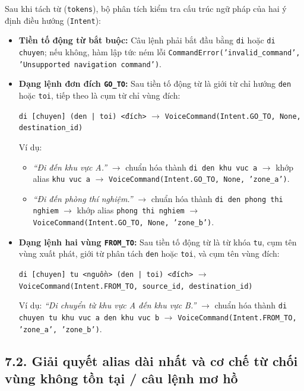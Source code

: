 Sau khi tách từ (\texttt{tokens}), bộ phân tích kiểm tra cấu trúc ngữ pháp của hai ý định điều hướng (\texttt{Intent}):
\begin{itemize}[leftmargin=1.2cm]
  \item \textbf{Tiền tố động từ bắt buộc:} Câu lệnh phải bắt đầu bằng \texttt{di} hoặc \texttt{di chuyen}; nếu không, hàm lập tức ném lỗi \texttt{CommandError('invalid\_command', 'Unsupported navigation command')}.
  \item \textbf{Dạng lệnh đơn đích \texttt{GO\_TO}:} Sau tiền tố động từ là giới từ chỉ hướng \texttt{den} hoặc \texttt{toi}, tiếp theo là cụm từ chỉ vùng đích:
  \begin{center}
    \texttt{di [chuyen] (den | toi) <đích>} $\longrightarrow$ \texttt{VoiceCommand(Intent.GO\_TO, None, destination\_id)}
  \end{center}
  Ví dụ:
  \begin{itemize}
    \item \textit{``Đi đến khu vực A.''} $\rightarrow$ chuẩn hóa thành \texttt{di den khu vuc a} $\rightarrow$ khớp alias \texttt{khu vuc a} $\rightarrow$ \texttt{VoiceCommand(Intent.GO\_TO, None, 'zone\_a')}.
    \item \textit{``Đi đến phòng thí nghiệm.''} $\rightarrow$ chuẩn hóa thành \texttt{di den phong thi nghiem} $\rightarrow$ khớp alias \texttt{phong thi nghiem} $\rightarrow$ \texttt{VoiceCommand(Intent.GO\_TO, None, 'zone\_b')}.
  \end{itemize}
  \item \textbf{Dạng lệnh hai vùng \texttt{FROM\_TO}:} Sau tiền tố động từ là từ khóa \texttt{tu}, cụm tên vùng xuất phát, giới từ phân tách \texttt{den} hoặc \texttt{toi}, và cụm tên vùng đích:
  \begin{center}
    \texttt{di [chuyen] tu <nguồn> (den | toi) <đích>} $\longrightarrow$ \texttt{VoiceCommand(Intent.FROM\_TO, source\_id, destination\_id)}
  \end{center}
  Ví dụ: \textit{``Di chuyển từ khu vực A đến khu vực B.''} $\rightarrow$ chuẩn hóa thành \texttt{di chuyen tu khu vuc a den khu vuc b} $\rightarrow$ \texttt{VoiceCommand(Intent.FROM\_TO, 'zone\_a', 'zone\_b')}.
\end{itemize}

\subsection*{7.2. Giải quyết alias dài nhất và cơ chế từ chối vùng không tồn tại / câu lệnh mơ hồ}

